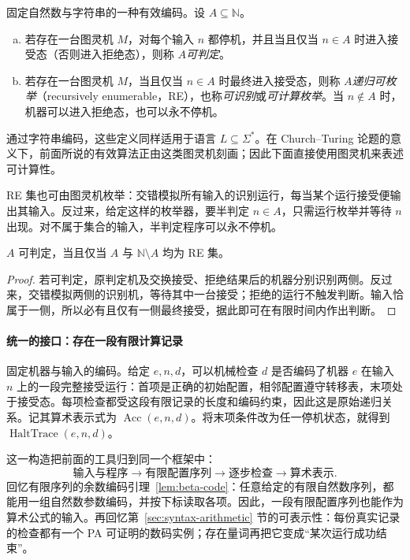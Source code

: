 \documentclass[lang=cn,a4paper,fontset=none,zihao=false,10pt,openany,twoside]{beautybook}
\numberwithin{algorithm}{chapter}
\newcommand{\N}{\mathbb N}
\begin{document}
\begin{definition}[可判定与递归可枚举]
固定自然数与字符串的一种有效编码。设 $A\subseteq\N$。
\begin{enumerate}[(a)]
\item 若存在一台图灵机 $M$，对每个输入 $n$ 都停机，并且当且仅当 $n\in A$ 时进入接受态（否则进入拒绝态），则称 $A$\emph{可判定}。
\item 若存在一台图灵机 $M$，当且仅当 $n\in A$ 时最终进入接受态，则称 $A$\emph{递归可枚举}（recursively enumerable，RE），也称\emph{可识别}或\emph{可计算枚举}。当 $n\notin A$ 时，机器可以进入拒绝态，也可以永不停机。
\end{enumerate}
通过字符串编码，这些定义同样适用于语言 $L\subseteq\Sigma^*$。在 Church--Turing 论题的意义下，前面所说的有效算法正由这类图灵机刻画；因此下面直接使用图灵机来表述可计算性。
\end{definition}

RE 集也可由图灵机枚举：交错模拟所有输入的识别运行，每当某个运行接受便输出其输入。反过来，给定这样的枚举器，要半判定 $n\in A$，只需运行枚举并等待 $n$ 出现。对不属于集合的输入，半判定程序可以永不停机。

\begin{proposition}
$A$ 可判定，当且仅当 $A$ 与 $\N\setminus A$ 均为 RE 集。
\end{proposition}
\begin{proof}
若可判定，原判定机及交换接受、拒绝结果后的机器分别识别两侧。反过来，交错模拟两侧的识别机，等待其中一台接受；拒绝的运行不触发判断。输入恰属于一侧，所以必有且仅有一侧最终接受，据此即可在有限时间内作出判断。
\end{proof}

\paragraph{统一的接口：存在一段有限计算记录}
固定机器与输入的编码。给定 $e,n,d$，可以机械检查 $d$ 是否编码了机器 $e$ 在输入 $n$ 上的一段完整接受运行：首项是正确的初始配置，相邻配置遵守转移表，末项处于接受态。每项检查都受这段有限记录的长度和编码约束，因此这是原始递归关系。记其算术表示式为 $\operatorname{Acc}(e,n,d)$。将末项条件改为任一停机状态，就得到 $\operatorname{HaltTrace}(e,n,d)$。

这一构造把前面的工具归到同一个框架中：
\[
 \text{输入与程序}\longrightarrow\text{有限配置序列}
 \longrightarrow\text{逐步检查}\longrightarrow\text{算术表示}.
\]
回忆有限序列的余数编码引理~\ref{lem:beta-code}：任意给定的有限自然数序列，都能用一组自然数参数编码，并按下标读取各项。因此，一段有限配置序列也能作为算术公式的输入。再回忆第~\ref{sec:syntax-arithmetic} 节的可表示性：每份真实记录的检查都有一个 PA 可证明的数码实例；存在量词再把它变成“某次运行成功结束”。
\end{document}
